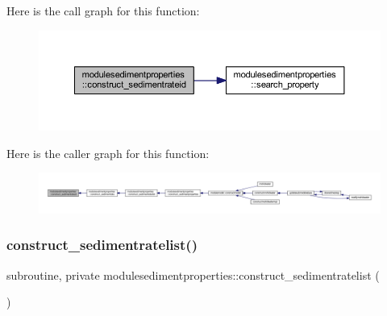 Here is the call graph for this function\+:\nopagebreak
\begin{figure}[H]
\begin{center}
\leavevmode
\includegraphics[width=350pt]{namespacemodulesedimentproperties_af77439b27c476526490c3dafac1f3411_cgraph}
\end{center}
\end{figure}
Here is the caller graph for this function\+:\nopagebreak
\begin{figure}[H]
\begin{center}
\leavevmode
\includegraphics[width=350pt]{namespacemodulesedimentproperties_af77439b27c476526490c3dafac1f3411_icgraph}
\end{center}
\end{figure}
\mbox{\label{namespacemodulesedimentproperties_ac8e0d26b714ef94bff3a38a7730ee2a5}} 
\subsubsection{\texorpdfstring{construct\+\_\+sedimentratelist()}{construct\_sedimentratelist()}}
{\footnotesize\ttfamily subroutine, private modulesedimentproperties\+::construct\+\_\+sedimentratelist (\begin{DoxyParamCaption}{ }\end{DoxyParamCaption})\hspace{0.3cm}{\ttfamily [private]}}

